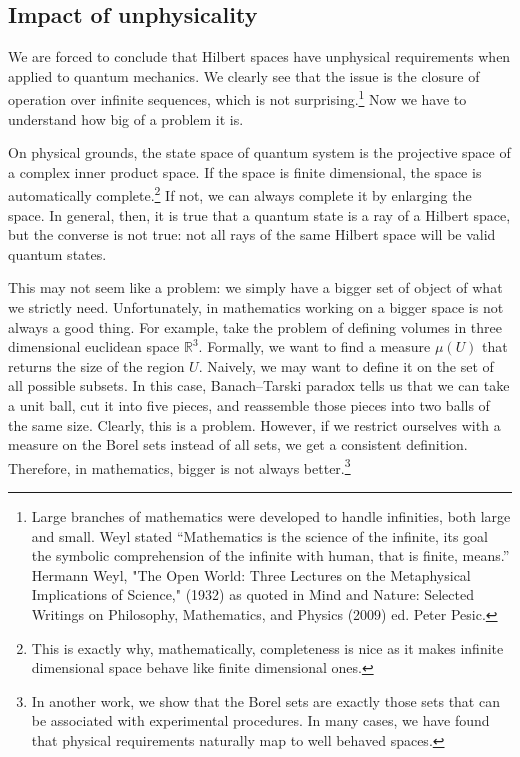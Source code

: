 \documentclass[10pt,twocolumn, nofootinbib]{revtex4-2}
\begin{document}
\subsection{Impact of unphysicality}

We are forced to conclude that Hilbert spaces have unphysical requirements when applied to quantum mechanics. We clearly see that the issue is the closure of operation over infinite sequences, which is not surprising.\footnote{Large branches of mathematics were developed to handle infinities, both large and small. Weyl stated ``Mathematics is the science of the infinite, its goal the symbolic comprehension of the infinite with human, that is finite, means.'' Hermann Weyl, "The Open World: Three Lectures on the Metaphysical Implications of Science," (1932) as quoted in Mind and Nature: Selected Writings on Philosophy, Mathematics, and Physics (2009) ed. Peter Pesic.} Now we have to understand how big of a problem it is.

On physical grounds, the state space of quantum system is the projective space of a complex inner product space. If the space is finite dimensional, the space is automatically complete.\footnote{This is exactly why, mathematically, completeness is nice as it makes infinite dimensional space behave like finite dimensional ones.} If not, we can always complete it by enlarging the space. In general, then, it is true that a quantum state is a ray of a Hilbert space, but the converse is not true: not all rays of the same Hilbert space will be valid quantum states.

This may not seem like a problem: we simply have a bigger set of object of what we strictly need. Unfortunately, in mathematics working on a bigger space is not always a good thing. For example, take the problem of defining volumes in three dimensional euclidean space $\mathbb{R}^3$. Formally, we want to find a measure $\mu(U)$ that returns the size of the region $U$. Naively, we may want to define it on the set of all possible subsets. In this case, Banach–Tarski paradox tells us that we can take a unit ball, cut it into five pieces, and reassemble those pieces into two balls of the same size. Clearly, this is a problem. However, if we restrict ourselves with a measure on the Borel sets instead of all sets, we get a consistent definition. Therefore, in mathematics, bigger is not always better.\footnote{In another work, we show that the Borel sets are exactly those sets that can be associated with experimental procedures. In many cases, we have found that physical requirements naturally map to well behaved spaces.}
\end{document}
